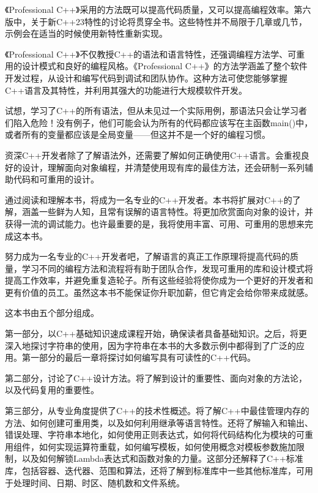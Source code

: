 
《Professional C++》采用的方法既可以提高代码质量，又可以提高编程效率。第六版中，关于新C++23特性的讨论将贯穿全书。这些特性并不局限于几章或几节，示例会在适当的时候使用新特性重新实现。

《Professional C++》不仅教授C++的语法和语言特性，还强调编程方法学、可重用的设计模式和良好的编程风格。《Professional C++》的方法学涵盖了整个软件开发过程，从设计和编写代码到调试和团队协作。这种方法可使您能够掌握C++语言及其特性，并利用其强大的功能进行大规模软件开发。

试想，学习了C++的所有语法，但从未见过一个实际用例，那语法只会让学习者们陷入危险！没有例子，他们可能会认为所有的代码都应该写在主函数main()中，或者所有的变量都应该是全局变量——但这并不是一个好的编程习惯。

资深C++开发者除了了解语法外，还需要了解如何正确使用C++语言。会重视良好的设计，理解面向对象编程，并清楚使用现有库的最佳方法，还会研制一系列辅助代码和可重用的设计。

通过阅读和理解本书，将成为一名专业的C++开发者。本书将扩展对C++的了解，涵盖一些鲜为人知，且常有误解的语言特性。将更加欣赏面向对象的设计，并获得一流的调试能力。也许最重要的是，我将使用丰富、可用、可重用的思想来完成这本书。

努力成为一名专业的C++开发者吧，了解语言的真正工作原理将提高代码的质量，学习不同的编程方法和流程将有助于团队合作，发现可重用的库和设计模式将提高工作效率，并避免重复造轮子。所有这些经验将使你成为一个更好的开发者和更有价值的员工。虽然这本书不能保证你升职加薪，但它肯定会给你带来成就感。


这本书由五个部分组成。

第一部分，以C++基础知识速成课程开始，确保读者具备基础知识。之后，将更深入地探讨字符串的使用，因为字符串在本书的大多数示例中都得到了广泛的应用。第一部分的最后一章将探讨如何编写具有可读性的C++代码。

第二部分，讨论了C++设计方法。将了解到设计的重要性、面向对象的方法论，以及代码复用的重要性。

第三部分，从专业角度提供了C++的技术性概述。将了解C++中最佳管理内存的方法、如何创建可重用类，以及如何利用继承等语言特性。还将了解输入和输出、错误处理、字符串本地化，如何使用正则表达式，如何将代码结构化为模块的可重用组件，如何实现运算符重载，如何编写模板，如何使用概念对模板参数施加限制，以及如何解锁Lambda表达式和函数对象的力量。这部分还解释了C++标准库，包括容器、迭代器、范围和算法，还将了解到标准库中一些其他标准库，可用于处理时间、日期、时区、随机数和文件系统。

